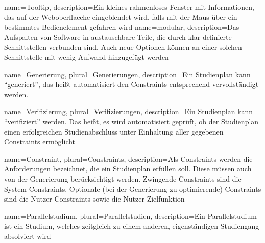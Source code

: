 {
	name=Tooltip,
	description={Ein kleines rahmenloses Fenster mit Informationen, das auf der \gls{Weboberflaeche} eingeblendet wird, falls mit der Maus über ein bestimmtes Bedienelement gefahren wird}
}
{
	name=modular,
	description={Das Aufspalten von Software in austauschbare Teile, die durch klar definierte Schnittstellen verbunden sind. Auch neue Optionen können an einer solchen Schnittstelle mit wenig Aufwand hinzugefügt werden}
}
	
{
	name=Generierung,
	plural=Generierungen,
	description={Ein \gls{Studienplan} kann \enquote{generiert}, das heißt automatisiert den \glspl{Constraint} entsprechend vervollständigt werden.}
}

{
name=Verifizierung,
plural=Verifizierungen,
description={Ein \gls{Studienplan} kann \enquote{verifiziert} werden. Das heißt, es wird automatisiert geprüft, ob der Studienplan einen erfolgreichen Studienabschluss unter Einhaltung aller gegebenen \glspl{Constraint} ermöglicht}
}

{
name=Constraint,
plural=Constraints,
description={Als Constraints werden die Anforderungen bezeichnet, die ein \gls{Studienplan} erfüllen soll. Diese müssen auch von der \gls{Generierung} berücksichtigt werden. Zwingende Constraints sind die \glspl{System-Constraint}. Optionale (bei der \gls{Generierung} zu optimierende) Constraints sind die \glspl{Nutzer-Constraint} sowie die \gls{Nutzer-Zielfunktion}}
}



{
name=Parallelstudium,
plural=Parallelstudien,
description={Ein Parallelstudium ist ein Studium, welches zeitgleich zu einem anderen, eigenständigen Studiengang absolviert wird}
}